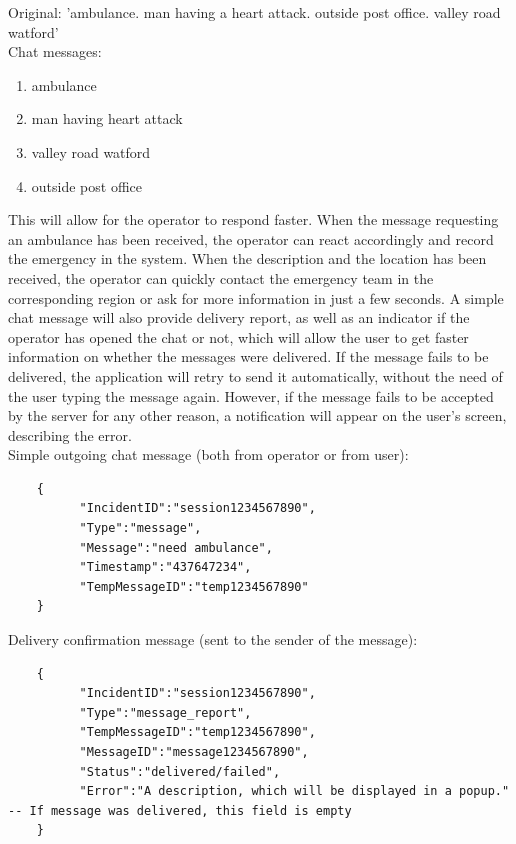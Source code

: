 \documentclass{article}
\begin{document}
Original: 'ambulance. man having a heart attack. outside post office. valley road watford'\\

Chat messages:
\begin{enumerate}

\item ambulance
\item man having heart attack
\item valley road watford
\item outside post office

\end{enumerate}
This will allow for the operator to respond faster. When the message requesting an ambulance has been received, the operator can react accordingly and record the emergency in the system. When the description and the location has been received, the operator can quickly contact the emergency team in the corresponding region or ask for more information in just a few seconds. A simple chat message will also provide delivery report, as well as an indicator if the operator has opened the chat or not, which will allow the user to get faster information on whether the messages were delivered. If the message fails to be delivered, the application will retry to send it automatically, without the need of the user typing the message again. However, if the message fails to be accepted by the server for any other reason, a notification will appear on the user’s screen, describing the error.\\

Simple outgoing chat message (both from operator or from user):
\begin{lstlisting}
	{
          "IncidentID":"session1234567890",
          "Type":"message",
          "Message":"need ambulance",
          "Timestamp":"437647234",
          "TempMessageID":"temp1234567890"
	}
\end{lstlisting}

Delivery confirmation message (sent to the sender of the message):
\begin{lstlisting}
	{
          "IncidentID":"session1234567890",
          "Type":"message_report",
          "TempMessageID":"temp1234567890",
          "MessageID":"message1234567890",
          "Status":"delivered/failed",
          "Error":"A description, which will be displayed in a popup." -- If message was delivered, this field is empty
	}
\end{lstlisting}
\end{document}
